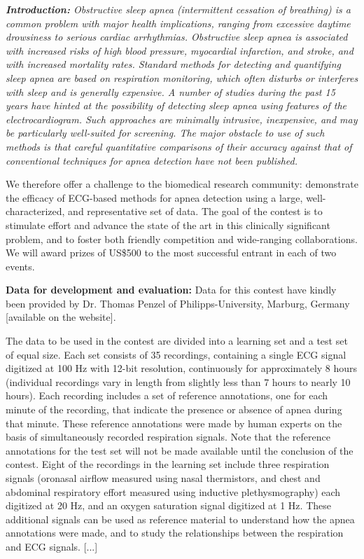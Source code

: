 {\it %
  {\rm \textbf{Introduction:}}
  Obstructive sleep apnea (intermittent cessation of breathing) is a
  common problem with major health implications, ranging from
  excessive daytime drowsiness to serious cardiac arrhythmias.
  Obstructive sleep apnea is associated with increased risks of high
  blood pressure, myocardial infarction, and stroke, and with
  increased mortality rates. Standard methods for detecting and
  quantifying sleep apnea are based on respiration monitoring, which
  often disturbs or interferes with sleep and is generally expensive.
  A number of studies during the past 15 years have hinted at the
  possibility of detecting sleep apnea using features of the
  electrocardiogram. Such approaches are minimally intrusive,
  inexpensive, and may be particularly well-suited for screening. The
  major obstacle to use of such methods is that careful quantitative
  comparisons of their accuracy against that of conventional
  techniques for apnea detection have not been published.

  We therefore offer a challenge to the biomedical research community:
  demonstrate the efficacy of ECG-based methods for apnea detection
  using a large, well-characterized, and representative set of data.
  The goal of the contest is to stimulate effort and advance the state
  of the art in this clinically significant problem, and to foster
  both friendly competition and wide-ranging collaborations. We will
  award prizes of US\$500 to the most successful entrant in each of two
  events.

  {\rm \textbf{Data for development and evaluation:}}
  Data for this contest have kindly been provided by Dr. Thomas
  Penzel   of Philipps-University, Marburg,
  Germany [available on the website].

  The data to be used in the contest are divided into a learning set
  and a test set of equal size. Each set consists of 35 recordings,
  containing a single ECG signal digitized at 100 Hz with 12-bit
  resolution, continuously for approximately 8 hours (individual
  recordings vary in length from slightly less than 7 hours to nearly
  10 hours). Each recording includes a set of reference annotations,
  one for each minute of the recording, that indicate the presence or
  absence of apnea during that minute. These reference annotations
  were made by human experts on the basis of simultaneously recorded
  respiration signals. Note that the reference annotations for the
  test set will not be made available until the conclusion of the
  contest. Eight of the recordings in the learning set include three
  respiration signals (oronasal airflow measured using nasal
  thermistors, and chest and abdominal respiratory effort measured
  using inductive plethysmography) each digitized at 20 Hz, and an
  oxygen saturation signal digitized at 1 Hz. These additional signals
  can be used as reference material to understand how the apnea
  annotations were made, and to study the relationships between the
  respiration and ECG signals. [...]

}
